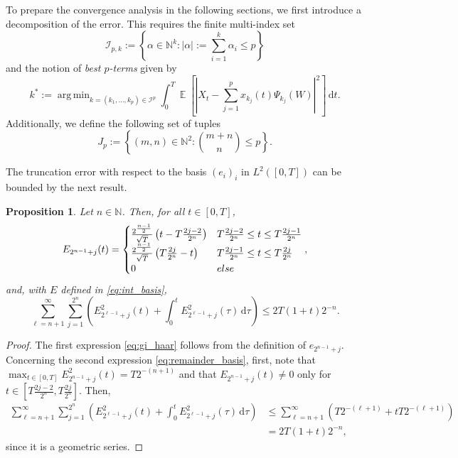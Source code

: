 \documentclass[12pt]{article}
\newtheorem{proposition}[theorem]{Proposition}
\theoremstyle{remark}
\theoremstyle{plain}
\numberwithin{equation}{section}
\DeclareMathOperator*{\argmin}{arg\,min}
\newcommand{\dd}{\ensuremath{\,\mathrm d}}
\DeclareMathOperator{\E}{\mathbb E}
\newcommand{\N}{\mathbb{N}}
\begin{document}
To prepare the convergence analysis in the following sections, we first introduce a decomposition of the error.
This requires the finite multi-index set
\begin{equation}
    \mathcal I_{p,k} := \left\{\alpha \in \N^k : |\alpha| := \sum_{i=1}^k \alpha_i \leq p \right\}
    \label{eq:finite_multiindex}
\end{equation}
and the notion of \emph{best $p$-terms} given by
\begin{equation}
    k^* := \argmin_{k = (k_1,\dots,k_p) \in \mathcal I^p} \int_0^T \E[|X_t - \sum_{j=1}^p x_{k_j}(t) \Psi_{k_j}(W)|^2]\dd t.
    \label{eq:best_p_terms}
\end{equation}
Additionally, we define the following set of tuples
\begin{equation*}
    J_p := \left\{(m,n) \in \N^2 : \binom{m+n}{n} \leq p\right\}.
\end{equation*}

The truncation error with respect to the basis $(e_i)_i$ in $L^2([0,T])$ can be bounded by the next result.
\begin{proposition}\label{proposition:decay_rest}
    Let $n \in \N$.
    Then, for all $t \in [0,T]$,
    \begin{equation}
    \label{eq:gi_haar}
        E_{2^{n-1}+j}(t) = \begin{cases}
            \frac{2^{\frac{n-1}{2}}}{\sqrt T}\left(t-T\frac{2j-2}{2^n}\right) & T\frac{2j-2}{2^n} \leq t \leq T\frac{2j-1}{2^n}\\
            \frac{2^{\frac{n-1}{2}}}{\sqrt T}\left(T\frac{2j}{2^n} - t\right) & T\frac{2j-1}{2^n} \leq t \leq T\frac{2j}{2^n}\\
            0 & \emph{else}
        \end{cases},
    \end{equation}
    and, with $E$ defined in \cref{eq:int_basis},
    \begin{equation}
    \label{eq:remainder_basis}
        \sum_{\ell=n+1}^\infty \sum_{j=1}^{2^n} \left(E_{2^{\ell-1}+j}^2(t) + \int_0^t E_{2^{\ell-1}+j}^2(\tau)\dd\tau \right) \leq 2T(1+t)2^{-n}.
    \end{equation}
\end{proposition}
\begin{proof}
    The first expression \cref{eq:gi_haar} follows from the definition of $e_{2^{n-1}+j}$.
    Concerning the second expression \cref{eq:remainder_basis}, first, note that $\max_{t \in [0,T]} E_{2^{n-1}+j}^2(t) = T2^{-(n+1)}$ and that $E_{2^{n-1}+j}(t) \neq 0$ only for $t \in \left[T\frac{2j-2}{2^n}, T\frac{2j}{2^n}\right]$. Then,
    \begin{align*}
        \sum_{\ell=n+1}^\infty \sum_{j=1}^{2^n} \left(E_{2^{\ell-1}+j}^2(t) + \int_0^t E_{2^{\ell-1}+j}^2(\tau)\dd\tau \right) & \leq \sum_{\ell=n+1}^\infty \left(T2^{-(\ell+1)} + tT 2^{-(\ell+1)}\right)\\
        & = 2T(1+t)2^{-n},
    \end{align*}
    since it is a geometric series.
\end{proof}
\end{document}
